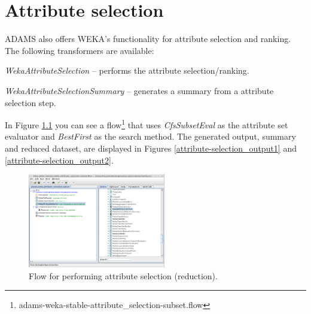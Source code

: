 %

\chapter{Attribute selection}
\label{attribute_selection}
ADAMS also offers WEKA's functionality for attribute selection and ranking.
The following transformers are available:
\begin{tight_itemize}
	\item \textit{WekaAttributeSelection} -- performs the attribute 
	selection/ranking.
	\item \textit{WekaAttributeSelectionSummary} -- generates a summary from
	a attribute selection step.
\end{tight_itemize}

In Figure \ref{attribute-selection_flow} you can see a flow\footnote{adams-weka-stable-attribute\_selection-subset.flow} 
that uses \textit{CfsSubsetEval} as the attribute set evaluator and \textit{BestFirst}
as the search method. The generated output, summary and reduced dataset,
are displayed in Figures \ref{attribute-selection_output1} and 
\ref{attribute-selection_output2}.

\begin{figure}[htb]
  \centering
  \includegraphics[width=6.0cm]{images/attribute-selection_flow.png}
  \caption{Flow for performing attribute selection (reduction).}
  \label{attribute-selection_flow}
\end{figure}

